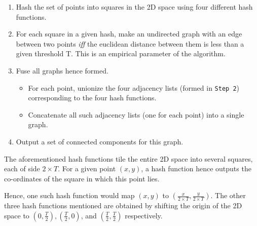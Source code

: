 \begin{enumerate}
\item Hash the set of points into squares in the 2D space using four different hash functions.
\item For each square in a given hash, make an undirected graph with an edge between two points \emph{iff} the euclidean distance between them is less than a given threshold {T}. This is an empirical parameter of the algorithm.
\item Fuse all graphs hence formed.
    \begin{itemize}
        \item For each point, unionize the four adjacency lists (formed in \texttt{Step 2}) corresponding to the four hash functions.
        \item Concatenate all such adjacency lists (one for each point) into a single graph.
    \end{itemize}
\item Output a set of connected components for this graph.
\end{enumerate}
The aforementioned hash functions tile the entire 2D space into several squares, each of side \begin{math}2\times{T}\end{math}. For a given point \begin{math} (x, y) \end{math}, a hash function hence outputs the co-ordinates of the square in which this point lies.

Hence, one such hash function would map \begin{math} (x, y) \end{math} to \begin{math} (\frac{x}{2\times{T}}, \frac{y}{2\times{T}}) \end{math}. The other three hash functions mentioned are obtained by shifting the origin of the 2D space to \begin{math}(0, \frac{T}{2}), (\frac{T}{2}, 0) \end{math}, and \begin{math}(\frac{T}{2}, \frac{T}{2})\end{math} respectively.

